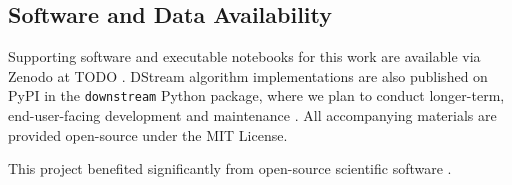 \subsection{Software and Data Availability} \label{sec:materials}


Supporting software and executable notebooks for this work are available via Zenodo at TODO \citep{moreno2024hsurf}.
DStream algorithm implementations are also published on PyPI in the \texttt{downstream} Python package, where we plan to conduct longer-term, end-user-facing development and maintenance \citep{moreno2024downstream}.
All accompanying materials are provided open-source under the MIT License.

This project benefited significantly from open-source scientific software \citep{2020SciPy-NMeth,harris2020array,reback2020pandas,mckinney-proc-scipy-2010,waskom2021seaborn,hunter2007matplotlib,moreno2023teeplot}.
